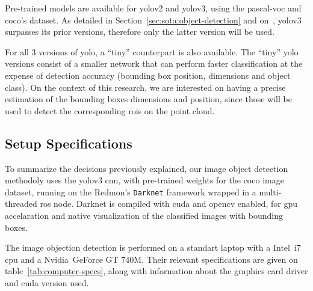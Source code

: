 Pre-trained models are available for \ac{yolo}v2 and \ac{yolo}v3, using the \ac{pascal-voc} and \ac{coco}'s dataset. As detailed in Section~\ref{sec:sota:object-detection} and on~\cite{Redmon2018}, \ac{yolo}v3 surpasses its prior versions, therefore only the latter version will be used. 

For all 3 versions of \ac{yolo}, a ``tiny'' counterpart is also available. The ``tiny'' \ac{yolo} versions consist of a smaller network that can perform faster classification at the expense of detection accuracy (bounding box position, dimensions and object class). On the context of this research, we are interested on having a precise estimation of the bounding boxes dimensions and position, since those will be used to detect the corresponding \acp{roi} on the point cloud. 

\subsection{Setup Specifications}
To summarize the decisions previously explained, our image object detection methodoly uses the \ac{yolo}v3 \ac{cnn}, with pre-trained weights for the \ac{coco} image dataset, running on the Redmon's \texttt{Darknet} framework wrapped in a multi-threaded \ac{ros} node. Darknet is compiled with \ac{cuda} and \ac{opencv} enabled, for \ac{gpu} accelaration and native visualization of the classified images with bounding boxes.

The image objection detection is performed on a standart laptop with a Intel\cp~i7 \ac{cpu} and a Nvidia\cp~GeForce GT 740M. Their relevant specifications are given on table~\ref{tab:computer-specs}, along with information about the graphics card driver and \ac{cuda} version used.

